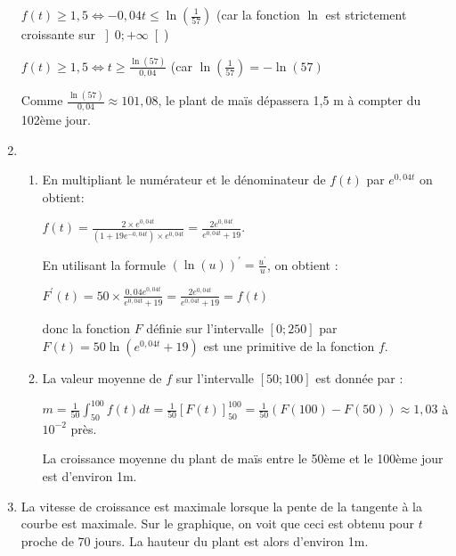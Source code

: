 \begin{corrige}
\begin{enumerate}
          \par
          $f\left(t\right)\geqslant 1,5 \Leftrightarrow -0,04t \leqslant  \ln\left(\frac{1}{57}\right)$ (car la fonction $\ln$ est strictement croissante sur $\left]0 ; +\infty \right[$)
          \par
          $f\left(t\right)\geqslant 1,5 \Leftrightarrow t \geqslant  \frac{\ln\left(57\right)}{0,04}$ (car $\ln\left(\frac{1}{57}\right)=-\ln\left(57\right)$
          \par
          Comme $\frac{\ln\left(57\right)}{0,04} \approx  101,08$, le plant de maïs dépassera 1,5 m à compter du 102ème jour.
          \item
          \begin{enumerate}[label=\alph*.]
               \item
               En multipliant le numérateur et le dénominateur de $f\left(t\right)$ par $e^{0,04t}$ on obtient:
               \par
               $f\left(t\right)=\frac{2\times e^{0,04t}}{\left(1+19e^{-0,04t}\right)\times e^{0,04t}}=\frac{2e^{0,04t}}{e^{0,04t}+19}$.
               \par
               En utilisant la formule $\left(\ln\left(u\right)\right)^{\prime}=\frac{u^{\prime}}{u}$, on obtient :
               \par
               $F^{\prime}\left(t\right)=50\times \frac{0,04e^{0,04t}}{e^{0,04t}+19}= \frac{2e^{0,04t}}{e^{0,04t}+19}=f\left(t\right)$
               \par
               donc la fonction $F$ définie sur l'intervalle $\left[0 ; 250\right]$ par $F\left(t\right)=50\ln \left(e^{0,04t}+19\right)$ est une primitive de la fonction $f$.
               \item
               La valeur moyenne de $f$ sur l'intervalle $\left[50 ; 100\right]$ est donnée par :
               \par
               $m=\frac{1}{50}\int_{50}^{100}f\left(t\right)dt=\frac{1}{50}\left[F\left(t\right)\right]_{50}^{100}=\frac{1}{50}\left(F\left(100\right)-F\left(50\right)\right)\approx 1,03$ à $10^{-2}$ près.
               \par
               La croissance moyenne du plant de maïs entre le 50ème et le 100ème jour est d'environ 1m.
          \end{enumerate}
          \item
          La vitesse de croissance est maximale lorsque la pente de la tangente à la courbe est maximale. Sur le graphique, on voit que ceci est obtenu pour $t$ proche de 70 jours. La hauteur du plant est alors d'environ 1m.
     \end{enumerate}
\end{corrige}
